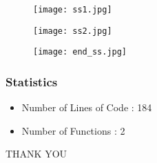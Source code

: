 \documentclass[14pt]{beamer}
\begin{document}
\begin{frame}
          \begin{figure}
	  \texttt{[image: ss1.jpg]}
           \end{figure} 
    \end{frame}
\begin{frame}
          \begin{figure}
	  \texttt{[image: ss2.jpg]}
           \end{figure} 
    \end{frame}
\begin{frame}
          \begin{figure}
	  \texttt{[image: end\_ss.jpg]}
           \end{figure} 
    \end{frame}
\begin{frame}
	\frametitle{Statistics}
        \begin{itemize}
	     \item Number of Lines of Code : 184
	     \item Number of Functions : 2
        \end{itemize}
    \end{frame}
    \begin{frame}
	\begin{center}
	     THANK YOU
	\end{center}
    \end{frame}
\end{document}
